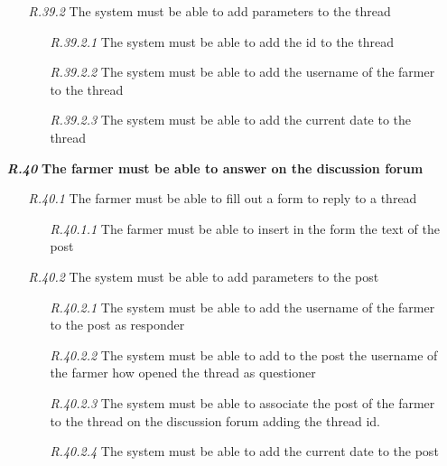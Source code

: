 \begin{itemize}
\begin{itemize}
\begin{itemize}
            \end{itemize}
	    \item [\textit{R.39.2}] The system must be able to add parameters to the thread
	        \begin{itemize}
	            \item [\textit{R.39.2.1}] The system must be able to add the id to the thread
                \item [\textit{R.39.2.2}] The system must be able to add the username of the farmer to the thread
		        \item [\textit{R.39.2.3}] The system must be able to add the current date to the thread
            \end{itemize}
        \end{itemize}
        \item [\textbf{\textit{R.40}}]\textbf{The farmer must be able to answer on the discussion forum}
        \begin{itemize}
        \item [\textit{R.40.1}] The farmer must be able to fill out a form to reply to a thread
            \begin{itemize}
                \item [\textit{R.40.1.1}] The farmer must be able to insert in the form the text of the post
            \end{itemize}
        \item [\textit{R.40.2}] The system must be able to add parameters to the post
            \begin{itemize}
                \item [\textit{R.40.2.1}] The system must be able to add the username of the farmer to the post as responder
                \item [\textit{R.40.2.2}] The system must be able to add to the post the username of the farmer how opened the thread as questioner
                \item [\textit{R.40.2.3}] The system must be able to associate the post of the farmer to the thread on the discussion forum adding the thread id.
                \item [\textit{R.40.2.4}] The system must be able to add the current date to the post
            \end{itemize}
        \end{itemize}
\end{itemize}
        